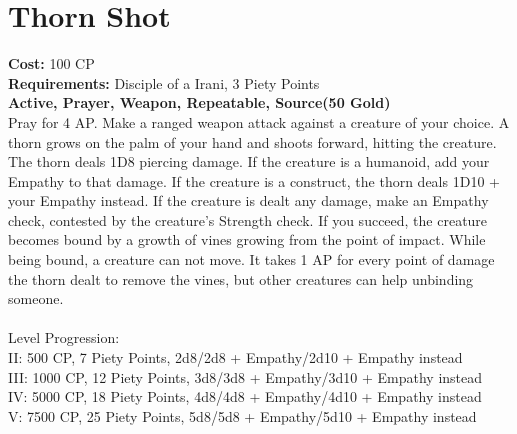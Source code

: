 \section{Thorn Shot}
\textbf{Cost:} 100 CP\\
\textbf{Requirements:} Disciple of a Irani, 3 Piety Points \\
\textbf{Active, Prayer, Weapon, Repeatable, Source(50 Gold)}\\
Pray for 4 AP. Make a ranged weapon attack against a creature of your choice. A thorn grows on the palm of your hand and shoots forward, hitting the creature. The thorn deals 1D8 piercing damage. If the creature is a humanoid, add your Empathy to that damage. If the creature is a construct, the thorn deals 1D10 + your Empathy instead. If the creature is dealt any damage, make an Empathy check, contested by the creature's Strength check. If you succeed, the creature becomes bound by a growth of vines growing from the point of impact. While being bound, a creature can not move. It takes 1 AP for every point of damage the thorn dealt to remove the vines, but other creatures can help unbinding someone.\\
\\
Level Progression:\\
II: 500 CP, 7 Piety Points, 2d8/2d8 + Empathy/2d10 + Empathy instead\\
III: 1000 CP, 12 Piety Points, 3d8/3d8 + Empathy/3d10 + Empathy instead\\
IV: 5000 CP, 18 Piety Points, 4d8/4d8 + Empathy/4d10 + Empathy instead\\
V: 7500 CP, 25 Piety Points, 5d8/5d8 + Empathy/5d10 + Empathy instead\\